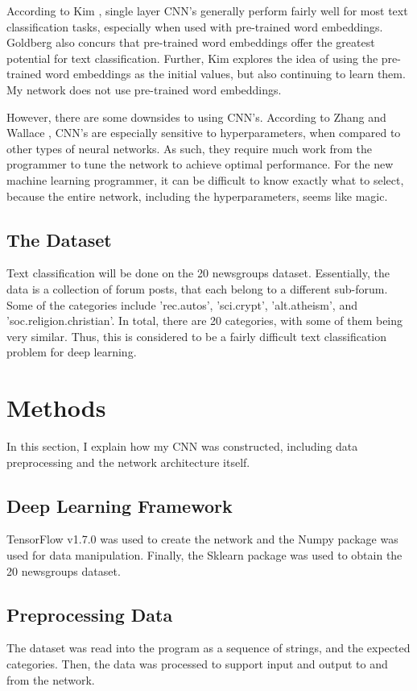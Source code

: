 \documentclass{article}
\begin{document}
According to Kim \cite{kim}, single layer CNN's generally perform fairly well for most text classification tasks, especially when used with
pre-trained word embeddings. Goldberg \cite{goldberg} also concurs that pre-trained word embeddings offer the greatest potential for text
classification. Further, Kim explores the idea of using the pre-trained word embeddings as the initial values, but also continuing to learn
them. My network does not use pre-trained word embeddings.

However, there are some downsides to using CNN's. According to Zhang and Wallace \cite{zhangwallace}, CNN's are especially sensitive to
hyperparameters, when compared to other types of neural networks. As such, they require much work from the programmer to tune the network
to achieve optimal performance. For the new machine learning programmer, it can be difficult to know exactly what to select, because the
entire network, including the hyperparameters, seems like magic.

\subsection{The Dataset}
Text classification will be done on the 20 newsgroups dataset. Essentially, the data is a collection of forum posts, that each belong to a
different sub-forum. Some of the categories include 'rec.autos', 'sci.crypt', 'alt.atheism', and 'soc.religion.christian'. In total, there
are 20 categories, with some of them being very similar. Thus, this is considered to be a fairly difficult text classification problem for
deep learning.

\section{Methods}
In this section, I explain how my CNN was constructed, including data preprocessing and the network architecture itself.

\subsection{Deep Learning Framework}
TensorFlow v1.7.0 was used to create the network and the Numpy package was used for data manipulation. Finally, the Sklearn package was used
to obtain the 20 newsgroups dataset.

\subsection{Preprocessing Data}
The dataset was read into the program as a sequence of strings, and the expected categories. Then, the data was processed to support input
and output to and from the network.
\end{document}
